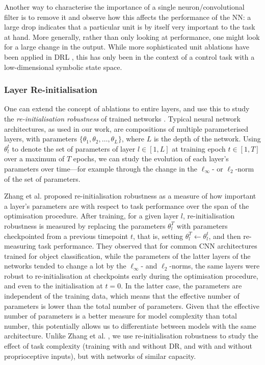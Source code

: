 \label{sec:unit_abl}

Another way to characterise the importance of a single
neuron/convolutional filter is to remove it and observe how this affects
the performance of the NN: a large drop indicates that a particular unit
is by itself very important to the task at hand. More generally, rather
than only looking at performance, one might look for a large change in
the output. {While more sophisticated unit ablations have been applied in DRL}
\cite{meyes2020you}, {this has only been in the context of a control task with a low-dimensional symbolic state space}.

\hypertarget{layer-re-initialisation}{%
\subsubsection{Layer Re-initialisation}\label{layer-re-initialisation}}

\label{sec:layer_abl}

One can extend the concept of ablations to entire layers, and use this
to study the \emph{re-initialisation robustness} of trained networks
\cite{zhang2019all}. Typical neural network architectures, as used in
our work, are compositions of multiple parameterised layers, with
parameters \(\{\theta_1, \theta_2, \ldots, \theta_L\}\), where \(L\) is
the depth of the network. Using \(\theta_l^t\) to denote the set of
parameters of layer \(l \in [1, L]\) at training epoch \(t \in [1, T]\)
over a maximum of \(T\) epochs, we can study the evolution of each
layer's parameters over time---for example through the change in the
\(\ell_\infty\)- or \(\ell_2\)-norm of the set of parameters.

Zhang et al. \cite{zhang2019all} proposed re-initialisation robustness
as a measure of how important a layer's parameters are with respect to
task performance over the span of the optimisation procedure. After
training, for a given layer \(l\), re-initialisation robustness is
measured by replacing the parameters \(\theta_l^T\) with parameters
checkpointed from a previous timepoint \(t\), that is, setting
\(\theta_l^T \leftarrow \theta_l^t\), and then re-measuring task
performance. They observed that for common CNN architectures trained for
object classification, while the parameters of the latter layers of the
networks tended to change a lot by the \(\ell_\infty\)- and
\(\ell_2\)-norms, the same layers were robust to re-initialisation at
checkpoints early during the optimisation procedure, and even to the
initialisation at \(t = 0\). In the latter case, the parameters are
independent of the training data, which means that the effective number
of parameters is lower than the total number of parameters. Given that
the effective number of parameters is a better measure for model
complexity than total number, this potentially allows us to
differentiate between models with the same architecture. Unlike Zhang et
al. \cite{zhang2019all}, we use re-initialisation robustness to study
the effect of task complexity (training with and without DR, and with
and without proprioceptive inputs), but with networks of similar
capacity.


